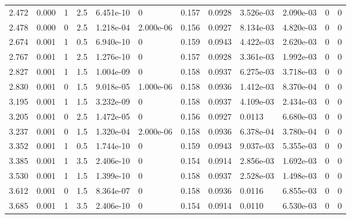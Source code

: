 \documentclass[preview]{standalone}
\begin{document}
{{\begin{tabular}{L{1.2cm}C{1.2cm} C{0.3cm}C{0.5cm} C{1.4cm}C{1.4cm} C{1.4cm}C{1.4cm} C{1.6cm}C{1.6cm} C{1.6cm}C{1.6cm}}
  2.472  &  0.000  & 1     & 2.5 &  6.451e-10  & 0  &  0.157&   0.0928& 3.526e-03 & 2.090e-03   &  0 & 0  \\ 
  2.478  &  0.000  & 0     & 2.5 &  1.218e-04  & 2.000e-06  &  0.156&   0.0927& 8.134e-03 & 4.820e-03   &  0 & 0  \\ 
  2.674  &  0.001  & 1     & 0.5 &  6.940e-10  & 0  &  0.159&   0.0943& 4.422e-03 & 2.620e-03   &  0 & 0  \\ 
  2.767  &  0.001  & 1     & 2.5 &  1.276e-10  & 0  &  0.157&   0.0928& 3.361e-03 & 1.992e-03   &  0 & 0  \\ 
  2.827  &  0.001  & 1     & 1.5 &  1.004e-09  & 0  &  0.158&   0.0937& 6.275e-03 & 3.718e-03   &  0 & 0  \\ 
  2.830  &  0.001  & 0     & 1.5 &  9.018e-05  & 1.000e-06  &  0.158&   0.0936& 1.412e-03 & 8.370e-04   &  0 & 0  \\ 
  3.195  &  0.001  & 1     & 1.5 &  3.232e-09  & 0  &  0.158&   0.0937& 4.109e-03 & 2.434e-03   &  0 & 0  \\ 
  3.205  &  0.001  & 0     & 2.5 &  1.472e-05  & 0  &  0.156&   0.0927& 0.0113 & 6.680e-03   &  0 & 0  \\ 
  3.237  &  0.001  & 0     & 1.5 &  1.320e-04  & 2.000e-06  &  0.158&   0.0936& 6.378e-04 & 3.780e-04   &  0 & 0  \\ 
  3.352  &  0.001  & 1     & 0.5 &  1.744e-10  & 0  &  0.159&   0.0943& 9.037e-03 & 5.355e-03   &  0 & 0  \\ 
  3.385  &  0.001  & 1     & 3.5 &  2.406e-10  & 0  &  0.154&   0.0914& 2.856e-03 & 1.692e-03   &  0 & 0  \\ 
  3.530  &  0.001  & 1     & 1.5 &  1.399e-10  & 0  &  0.158&   0.0937& 2.528e-03 & 1.498e-03   &  0 & 0  \\ 
  3.612  &  0.001  & 0     & 1.5 &  8.364e-07  & 0  &  0.158&   0.0936& 0.0116 & 6.855e-03   &  0 & 0  \\ 
  3.685  &  0.001  & 1     & 3.5 &  2.406e-10  & 0  &  0.154&   0.0914& 0.0110 & 6.530e-03   &  0 & 0  \\ 
\hline 
\end{tabular} 

}}
\end{document}
